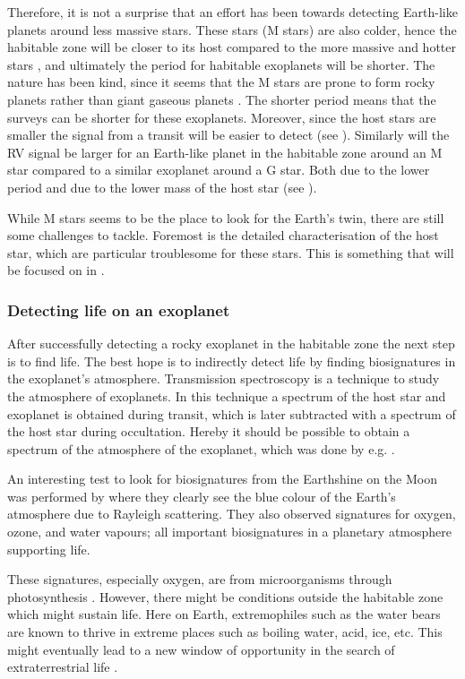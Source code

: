Therefore, it is not a surprise that an effort has been towards detecting Earth-like planets around
less massive stars. These stars (M stars) are also colder, hence the habitable zone will be closer
to its host compared to the more massive and hotter stars \citep{Kasting1997}, and ultimately the
period for habitable exoplanets will be shorter. The nature has been kind, since it seems that the M
stars are prone to form rocky planets rather than giant gaseous planets
\citep{Bonfils2013,Delfosse2013}. The shorter period means that the surveys can be shorter for these
exoplanets. Moreover, since the host stars are smaller the signal from a transit will be easier to
detect (see ). Similarly will the RV signal be larger for an Earth-like planet in
the habitable zone around an M star compared to a similar exoplanet around a G star. Both due to the
lower period and due to the lower mass of the host star (see ).

While M stars seems to be the place to look for the Earth's twin, there are still some challenges to
tackle. Foremost is the detailed characterisation of the host star, which are particular troublesome
for these stars. This is something that will be focused on in .

\subsubsection{Detecting life on an exoplanet}

After successfully detecting a rocky exoplanet in the habitable zone the next step is to find life.
The best hope is to indirectly detect life by finding biosignatures \citep{Kasting2002} in the
exoplanet's atmosphere. Transmission spectroscopy is a technique to study the atmosphere of
exoplanets. In this technique a spectrum of the host star and exoplanet is obtained during transit,
which is later subtracted with a spectrum of the host star during occultation. Hereby it should be
possible to obtain a spectrum of the atmosphere of the exoplanet, which was done by e.g.
\citet{Charbonneau2002}.

An interesting test to look for biosignatures from the Earthshine on the Moon was performed by
\citet{Arnold2002} where they clearly see the blue colour of the Earth's atmosphere due to Rayleigh
scattering. They also observed signatures for oxygen, ozone, and water vapours; all important
biosignatures in a planetary atmosphere supporting life.

These signatures, especially oxygen, are from microorganisms through photosynthesis
\citep[see e.g.][]{Kasting2002}. However, there might be conditions outside the habitable zone which
might sustain life. Here on Earth, extremophiles such as the water bears are known to thrive in
extreme places such as boiling water, acid, ice, etc. This might eventually lead to a new window of
opportunity in the search of extraterrestrial life \citep{Cavicchioli2002}.



